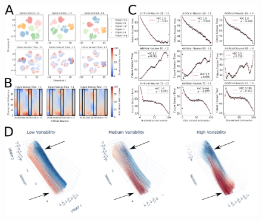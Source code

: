 \begin{figure}[!htb]
\centering
\includegraphics[width=\textwidth]{images/chapter_4/dynamic_repr_42.png}

\end{figure}
